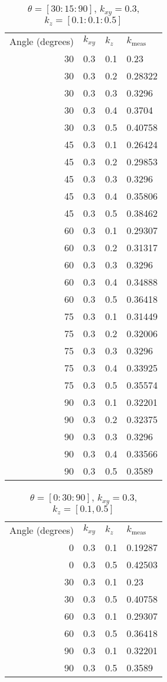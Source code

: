 \begin{table}
\caption{\(\theta=[30:15:90]\), \(k_{xy} = 0.3\), \(k_z = [0.1:0.1:0.5]\)}
\begin{tabular}{r l l | l}
Angle (degrees) & \(k_{xy}\) & \(k_z\) & \(k_{\textrm{meas}}\)\\
30 & 0.3 & 0.1 & 0.23\\
30 & 0.3 & 0.2 & 0.28322\\
30 & 0.3 & 0.3 & 0.3296\\
30 & 0.3 & 0.4 & 0.3704\\
30 & 0.3 & 0.5 & 0.40758\\
45 & 0.3 & 0.1 & 0.26424\\
45 & 0.3 & 0.2 & 0.29853\\
45 & 0.3 & 0.3 & 0.3296\\
45 & 0.3 & 0.4 & 0.35806\\
45 & 0.3 & 0.5 & 0.38462\\
60 & 0.3 & 0.1 & 0.29307\\
60 & 0.3 & 0.2 & 0.31317\\
60 & 0.3 & 0.3 & 0.3296\\
60 & 0.3 & 0.4 & 0.34888\\
60 & 0.3 & 0.5 & 0.36418\\
75 & 0.3 & 0.1 & 0.31449\\
75 & 0.3 & 0.2 & 0.32006\\
75 & 0.3 & 0.3 & 0.3296\\
75 & 0.3 & 0.4 & 0.33925\\
75 & 0.3 & 0.5 & 0.35574\\
90 & 0.3 & 0.1 & 0.32201\\
90 & 0.3 & 0.2 & 0.32375\\
90 & 0.3 & 0.3 & 0.3296\\
90 & 0.3 & 0.4 & 0.33566\\
90 & 0.3 & 0.5 & 0.3589\\
\end{tabular}
\end{table}

\begin{table}
\caption{\(\theta=[0:30:90]\), \(k_{xy} = 0.3\), \(k_z = [0.1, 0.5]\)}
\begin{tabular}{r l l | l}
Angle (degrees) & \(k_{xy}\) & \(k_z\) & \(k_{\textrm{meas}}\)\\
0 & 0.3 & 0.1 & 0.19287\\
0 & 0.3 & 0.5 & 0.42503\\
30 & 0.3 & 0.1 & 0.23\\
30 & 0.3 & 0.5 & 0.40758\\
60 & 0.3 & 0.1 & 0.29307\\
60 & 0.3 & 0.5 & 0.36418\\
90 & 0.3 & 0.1 & 0.32201\\
90 & 0.3 & 0.5 & 0.3589\\
\end{tabular}
\end{table}

